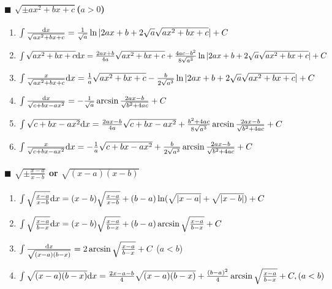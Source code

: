 \paragraph{$\blacksquare$ $\sqrt{\pm ax^2+bx+c}$($a>0$)}

\begin{enumerate}

\item $ \int \frac{\mathrm{d} x}{\sqrt{ax^2+bx+c}} = \frac{1}{\sqrt{a}} \ln | 2ax+b+2\sqrt{a}\sqrt{ax^2+bx+c} | + C $

\item $ \int \sqrt{ax^2+bx+c} \mathrm{d} x = \frac{2ax+b}{4a}\sqrt{ax^2+bx+c} +
	\frac{4ac-b^2}{8\sqrt{a^3}}\ln |2ax+b+2\sqrt{a}\sqrt{ax^2+bx+c}| + C $

\item $ \int \frac{x}{\sqrt{ax^2+bx+c}} \mathrm{d} x = \frac{1}{a}\sqrt{ax^2+bx+c} -
	\frac{b}{2\sqrt{a^3}}\ln | 2ax+b+2\sqrt{a}\sqrt{ax^2+bx+c} | + C $

\item $ \int \frac{\mathrm{d} x}{\sqrt{c+bx-ax^2}} = -\frac{1}{\sqrt{a}} \arcsin \frac{2ax-b}{\sqrt{b^2+4ac}} + C  $

\item $ \int \sqrt{c+bx-ax^2} \mathrm{d} x = \frac{2ax-b}{4a}\sqrt{c+bx-ax^2} + \\
	\frac{b^2+4ac}{8\sqrt{a^3}}\arcsin\frac{2ax-b}{\sqrt{b^2+4ac}} + C $

\item $ \int \frac{x}{\sqrt{c+bx-ax^2}} \mathrm{d} x = -\frac{1}{a}\sqrt{c+bx-ax^2} + \frac{b}{2\sqrt{a^3}}\arcsin\frac{2ax-b}{\sqrt{b^2+4ac}} + C $

\end{enumerate}

\paragraph{$\blacksquare$ $\sqrt{\pm\frac{x-a}{x-b}}$ or $\sqrt{(x-a)(x-b)}$}

\begin{enumerate}

\item $ \int \sqrt\frac{x-a}{x-b} \mathrm{d} x = (x-b)\sqrt\frac{x-a}{x-b} + (b-a)\ln(\sqrt{|x-a|}+\sqrt{|x-b|}) + C $

\item $ \int \sqrt\frac{x-a}{b-x} \mathrm{d} x = (x-b)\sqrt\frac{x-a}{b-x} + (b-a)\arcsin\sqrt\frac{x-a}{b-x} + C $

\item $ \int \frac{\mathrm{d} x}{\sqrt{(x-a)(b-x)}} = 2\arcsin\sqrt\frac{x-a}{b-x} + C$ ($a<b$)

\item $ \int \sqrt{(x-a)(b-x)} \mathrm{d} x = \frac{2x-a-b}{4}\sqrt{(x-a)(b-x)} + \frac{(b-a)^2}{4}\arcsin\sqrt\frac{x-a}{b-x} + C, (a<b) $

\end{enumerate}

